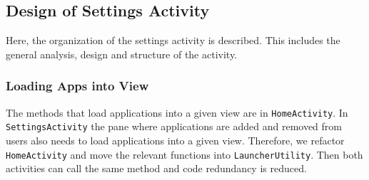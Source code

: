\subsection{Design of Settings Activity}\label{sec:sprint3:designsettings}
Here, the organization of the settings activity is described.
This includes the general analysis, design and structure of the activity.




\subsubsection{Loading Apps into View}\label{sec:sprint:designlauncher}

The methods that load applications into a given view are in \lstinline!HomeActivity!.
In \lstinline!SettingsActivity! the pane where applications are added and removed from users also needs to load applications into a given view.
Therefore, we refactor \lstinline!HomeActivity! and move the relevant functions into \lstinline!LauncherUtility!.
Then both activities can call the same method and code redundancy is reduced. 